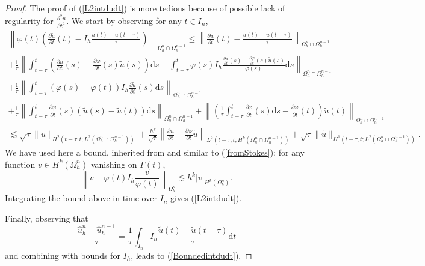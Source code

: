 \documentclass[11pt,a4paper]{article}
\theoremstyle{plain}
\theoremstyle{definition}
\theoremstyle{remark}
\numberwithin{equation}{section}
\newcommand{\dt}{\mathrm{d}t}
\newcommand{\ds}{\mathrm{d}s}
\begin{document}
\begin{proof}
	The proof of (\ref{L2intdudt}) is more tedious because of possible lack of regularity for $\frac{\partial^2 \tilde{ u}}{\partial t^2}$. We start by	observing for any $t \in I_n$,
	\begin{multline*}
		\left\| \varphi (t) \left( \frac{\partial \tilde{u}}{\partial t} (t)
	- I_h \frac{\tilde{u} (t) - \tilde{u} (t - \tau)}{\tau} \right) \right\|_{\Omega_h^n \cap \Omega_h^{n - 1}} \leqslant \left\|
	\frac{\partial u}{\partial t} (t) - \frac{u (t) - u (t - \tau)}{\tau}
	\right\|_{\Omega_h^n \cap \Omega_h^{n - 1}} \\
	 + \frac{1}{\tau} \left\| \int_{t - \tau}^t \left( \frac{\partial
		u}{\partial t} (s) - \frac{\partial \varphi}{\partial t} (s) \tilde{u} (s)
	\right) \ds - \int_{t - \tau}^t \varphi (s) I_h \frac{\frac{\partial
			u}{\partial t} (s) - \frac{\partial \varphi}{\partial t} (s) \tilde{u}
		(s)}{\varphi (s)} \ds \right\|_{\Omega_h^n \cap \Omega_h^{n -
			1}} \\
	 + \frac{1}{\tau} \left\| \int_{t - \tau}^t (\varphi (s) - \varphi (t))
	I_h \frac{\partial \tilde{u}}{\partial t} (s) \ds \right\|_{\Omega_h^n \cap \Omega_h^{n - 1}} \\
	 + \frac{1}{\tau} \left\| \int_{t - \tau}^t \frac{\partial
		\varphi}{\partial t} (s) (\tilde{u} (s) - \tilde{u} (t)) \ds \right\|_{\Omega_h^n \cap \Omega_h^{n - 1}} + \left\| \left(
	\frac{1}{\tau} \int_{t - \tau}^t \frac{\partial \varphi}{\partial t} (s)
	\ds - \frac{\partial \varphi}{\partial t} (t) \right) \tilde{u} (t)
	\right\|_{\Omega_h^n \cap \Omega_h^{n - 1}} \\
	 \lesssim \sqrt{\tau} \|u\|_{H^2 (t - \tau, t ; L^2 (\Omega^n_h \cap
		\Omega_h^{n - 1}))} + \frac{h^k}{\sqrt{\tau}} \left\| \frac{\partial
		u}{\partial t} - \frac{\partial \varphi}{\partial t} \tilde{u} \right\|_{L^2
		(t - \tau, t ; H^k (\Omega^n_h \cap \Omega_h^{n - 1}))}
	 + \sqrt{\tau} \| \tilde{u} \|_{H^1 (t - \tau, t ; L^2 (\Omega^n_h \cap
		\Omega_h^{n - 1}))} .
	\end{multline*}
	We have used here a bound, inherited from \cite{duprez2023phi} and similar to
	(\ref{fromStokes}): for any function $v \in H^k (\Omega_h^n)$ vanishing on
	$\Gamma (t)$,
	\begin{equation}\label{fromStokesL2}
	 \left\|v - \varphi (t) I_h  \frac{v}{\varphi (t)} \right\|_{\Omega_h^n} \lesssim h^k | v
	|_{H^k (\Omega^n_h)}.
	\end{equation}
	Integrating the bound above in time over $I_n$ gives (\ref{L2intdudt}).

	Finally, observing that
	\[ \frac{{\hat{u}_h^n}  - \hat{u}_h^{n - 1}}{\tau} = \frac{1}{\tau}
	\int_{I_n} I_h \frac{\tilde{u} (t) - \tilde{u} (t - \tau)}{\tau} \dt
	\]
	and combining with bounds for $I_h$, leads to (\ref{Boundedintdudt}).
\end{proof}
\end{document}
